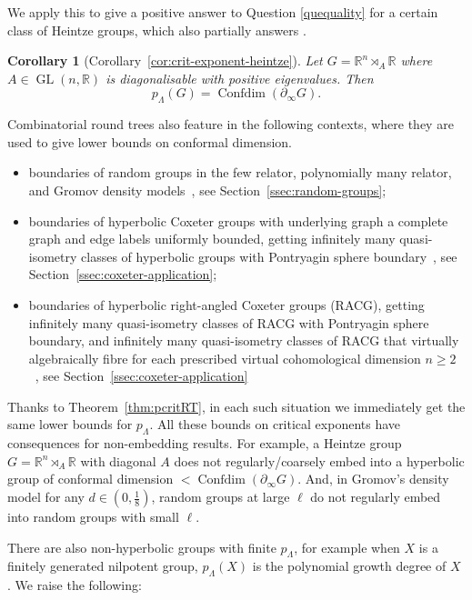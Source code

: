 \documentclass[11pt]{amsart}
\numberwithin{equation}{section}
\newtheorem{corollary}[equation]{Corollary}
\theoremstyle{citing}
\DeclareMathOperator{\GL}{GL}
\DeclareMathOperator{\Confdim}{Confdim}
\newcommand{\bdry}{\partial_\infty}
\newcommand{\R}{\mathbb{R}}
\newcommand{\pcrit}{p_{\Lambda}}
\numberwithin{equation}{section}
\begin{document}
We apply this to give a positive answer to Question \ref{quequality} for a certain class of Heintze groups, which also partially answers \cite[Question 8.7]{HumeMackTess-PprofLie}.
\begin{corollary}[Corollary~\ref{cor:crit-exponent-heintze}]
	\label{cor:crit-exponent-heintze-intro}
    Let $G=\R^n\rtimes_A\R$ where $A\in\GL(n,\R)$ is diagonalisable with positive eigenvalues. Then
    \[
    \pcrit(G) = \Confdim(\bdry G).
    \]
\end{corollary}

Combinatorial round trees also feature in the following contexts, where they are used to give lower bounds on conformal dimension.
\begin{itemize}
	\item boundaries of random groups in the few relator, polynomially many relator, and Gromov density models~\cite{Mac-12-random-cdim,Mac-16-confdim-subcplxs,Frost-22-confdim-random}, see Section~\ref{ssec:random-groups};
	\item boundaries of hyperbolic Coxeter groups with underlying graph a complete graph and edge labels uniformly bounded, getting infinitely many quasi-isometry classes of hyperbolic groups with Pontryagin sphere boundary~\cite{Field-Gupta-Lyman-Stark-25-coxeter-confdim}, see Section~\ref{ssec:coxeter-application};
	\item boundaries of hyperbolic right-angled Coxeter groups (RACG), getting infinitely many quasi-isometry classes of RACG with Pontryagin sphere boundary, and infinitely many quasi-isometry classes of RACG that virtually algebraically fibre for each prescribed virtual cohomological dimension $n \geq 2$~\cite{Cashen-Dani-Schreve-Stark-25-RACG-confdim}, see Section~\ref{ssec:coxeter-application}
\end{itemize}

Thanks to Theorem~\ref{thm:pcritRT}, in each such situation we immediately get the same lower bounds for $p_\Lambda$. 
All these bounds on critical exponents have consequences for non-em\-bed\-ding results.
For example, a Heintze group $G=\R^n \rtimes_A \R$ with diagonal $A$ does not regularly/coarsely embed into a hyperbolic group of conformal dimension $< \Confdim(\bdry G)$.  And, in Gromov's density model for any $d \in (0,\frac{1}{8})$, random groups at large $\ell$ do not regularly embed into random groups with small $\ell$.


There are also non-hyperbolic groups with finite $\pcrit$, for example when $X$ is a finitely generated nilpotent group, $\pcrit(X)$ is the polynomial growth degree of $X$ \cite{HumeMackTess-Pprof}. We raise the following:
\end{document}
